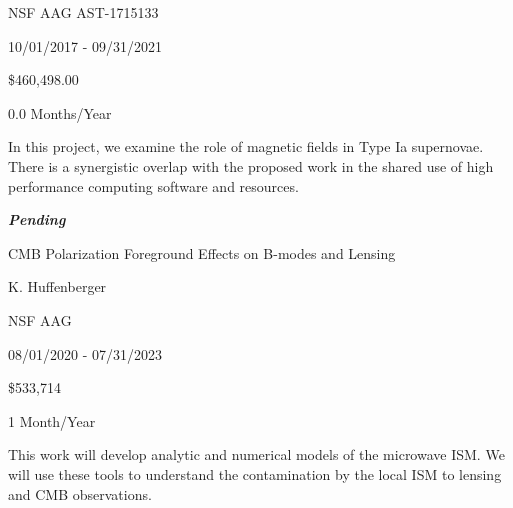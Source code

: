 \documentclass[10pt]{article}
\begin{document}
 NSF AAG AST-1715133

 10/01/2017 - 09/31/2021 

 \$460,498.00

 0.0 Months/Year

 In this project, we examine the role of magnetic fields in
Type Ia supernovae.  There
is a synergistic overlap with the proposed work in the shared use of high
performance computing software and resources.


\vspace{0.1in}

\noindent \large{\textbf{\emph{Pending}}}

 CMB Polarization Foreground Effects on B-modes and Lensing

 K. Huffenberger

 NSF AAG 

 08/01/2020 - 07/31/2023

 \$533,714

 1 Month/Year

This work will develop analytic and numerical models of the microwave ISM. We
will use these tools to understand the contamination by the local ISM to lensing
and CMB observations.

\vspace{0.1in}
\end{document}
